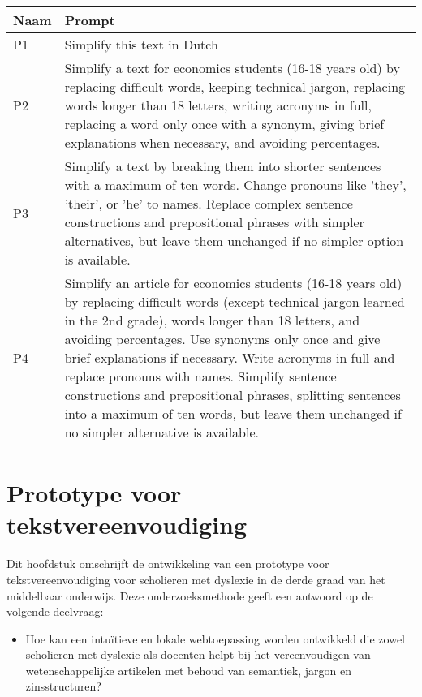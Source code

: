 \begin{center}
	\begin{tabular}{ | m{2cm} | m{14cm} | } 
		\hline
		\textbf{Naam} & \textbf{Prompt} \\
		\hline
		P1 & Simplify this text in Dutch \\
		\hline
		P2 & Simplify a text for economics students (16-18 years old) by replacing difficult words, keeping technical jargon, replacing words longer than 18 letters, writing acronyms in full, replacing a word only once with a synonym, giving brief explanations when necessary, and avoiding percentages. \\
		\hline
		P3 & Simplify a text by breaking them into shorter sentences with a maximum of ten words. Change pronouns like 'they', 'their', or 'he' to names. Replace complex sentence constructions and prepositional phrases with simpler alternatives, but leave them unchanged if no simpler option is available. \\
		\hline
		P4 & Simplify an article for economics students (16-18 years old) by replacing difficult words (except technical jargon learned in the 2nd grade), words longer than 18 letters, and avoiding percentages. Use synonyms only once and give brief explanations if necessary. Write acronyms in full and replace pronouns with names. Simplify sentence constructions and prepositional phrases, splitting sentences into a maximum of ten words, but leave them unchanged if no simpler alternative is available. \\
		\hline
	\end{tabular}
	\label{table:technologies}
\end{center}

\section{Prototype voor tekstvereenvoudiging}

Dit hoofdstuk omschrijft de ontwikkeling van een prototype voor tekstvereenvoudiging voor scholieren met dyslexie in de derde graad van het middelbaar onderwijs. Deze onderzoeksmethode geeft een antwoord op de volgende deelvraag: 

\begin{itemize}
	\item Hoe kan een intuïtieve en lokale webtoepassing worden ontwikkeld die zowel scholieren met dyslexie als docenten helpt bij het vereenvoudigen van wetenschappelijke artikelen met behoud van semantiek, jargon en zinsstructuren?
\end{itemize}

